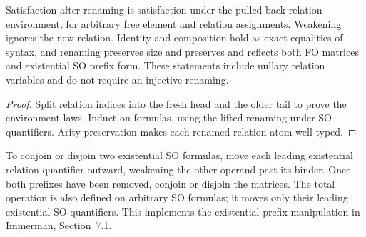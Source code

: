 \begin{theorem}
  \label{thm:desc-so-renaming}
  \leanok
  Satisfaction after renaming is satisfaction under the pulled-back relation
  environment, for arbitrary free element and relation assignments. Weakening
  ignores the new relation. Identity and composition hold as exact equalities
  of syntax, and renaming preserves size and preserves and reflects both FO
  matrices and existential SO prefix form. These statements include nullary
  relation variables and do not require an injective renaming.
\end{theorem}
\begin{proof}
  \leanok
  Split relation indices into the fresh head and the older tail to prove the
  environment laws. Induct on formulas, using the lifted renaming under SO
  quantifiers. Arity preservation makes each renamed relation atom well-typed.
\end{proof}

\begin{definition}
  \label{def:desc-exist-so-connectives}
  \leanok
  To conjoin or disjoin two existential SO formulas, move each leading
  existential relation quantifier outward, weakening the other operand past its
  binder. Once both prefixes have been removed, conjoin or disjoin the matrices.
  The total operation is also defined on arbitrary SO formulas; it moves only
  their leading existential SO quantifiers. This implements the existential
  prefix manipulation in Immerman, Section~7.1.
\end{definition}

